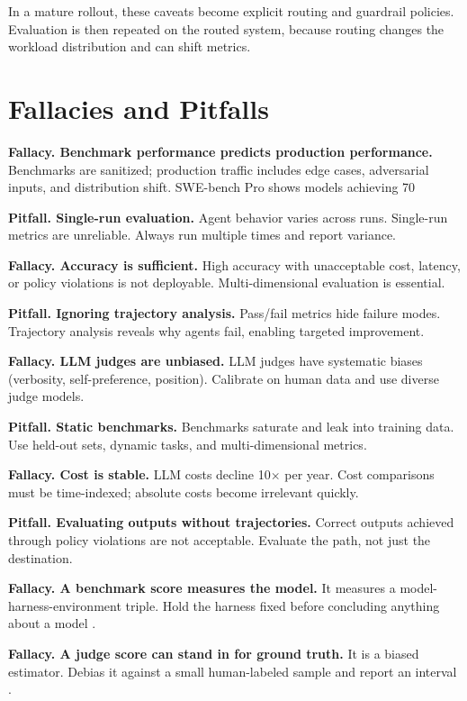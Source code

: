 In a mature rollout, these caveats become explicit routing and guardrail policies. Evaluation is then repeated on the routed system, because routing changes the workload distribution and can shift metrics.

\section{Fallacies and Pitfalls}

\textbf{Fallacy. Benchmark performance predicts production performance.} Benchmarks are sanitized; production traffic includes edge cases, adversarial inputs, and distribution shift. SWE-bench Pro shows models achieving 70%

\textbf{Pitfall. Single-run evaluation.} Agent behavior varies across runs. Single-run metrics are unreliable. Always run multiple times and report variance.

\textbf{Fallacy. Accuracy is sufficient.} High accuracy with unacceptable cost, latency, or policy violations is not deployable. Multi-dimensional evaluation is essential.

\textbf{Pitfall. Ignoring trajectory analysis.} Pass/fail metrics hide failure modes. Trajectory analysis reveals why agents fail, enabling targeted improvement.

\textbf{Fallacy. LLM judges are unbiased.} LLM judges have systematic biases (verbosity, self-preference, position). Calibrate on human data and use diverse judge models.

\textbf{Pitfall. Static benchmarks.} Benchmarks saturate and leak into training data. Use held-out sets, dynamic tasks, and multi-dimensional metrics.

\textbf{Fallacy. Cost is stable.} LLM costs decline 10$\times$ per year. Cost comparisons must be time-indexed; absolute costs become irrelevant quickly.

\textbf{Pitfall. Evaluating outputs without trajectories.} Correct outputs achieved through policy violations are not acceptable. Evaluate the path, not just the destination.

\textbf{Fallacy. A benchmark score measures the model.} It measures a
model-harness-environment triple. Hold the harness fixed before concluding
anything about a model \cite{modelharness2026, uniace2026, harnessdiverge2026}.

\textbf{Fallacy. A judge score can stand in for ground truth.} It is a biased
estimator. Debias it against a small human-labeled sample and report an interval
\cite{glide2026}.


